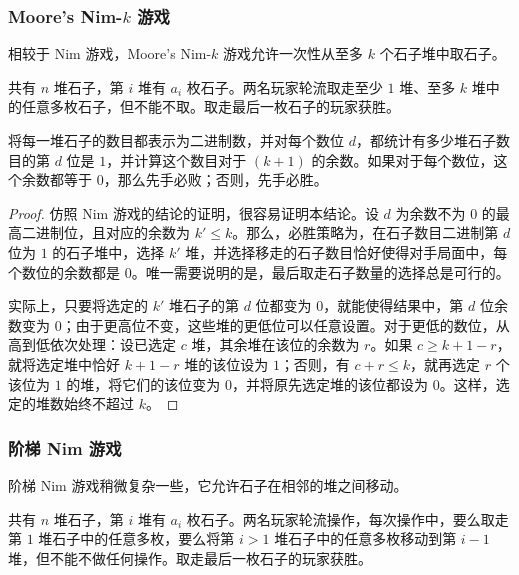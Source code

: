 \subsubsection{Moore's Nim-$k$ 游戏}

相较于 Nim 游戏，Moore's Nim-$k$ 游戏允许一次性从至多 $k$ 个石子堆中取石子。

\begin{game}
	共有 $n$ 堆石子，第 $i$ 堆有 $a_i$ 枚石子。两名玩家轮流取走至少 $1$ 堆、至多 $k$ 堆中的任意多枚石子，但不能不取。取走最后一枚石子的玩家获胜。
\end{game}

\begin{theorem}
	将每一堆石子的数目都表示为二进制数，并对每个数位 $d$，都统计有多少堆石子数目的第 $d$ 位是 $1$，并计算这个数目对于 $(k+1)$ 的余数。如果对于每个数位，这个余数都等于 $0$，那么先手必败；否则，先手必胜。
\end{theorem}

\begin{proof}
	仿照 Nim 游戏的结论的证明，很容易证明本结论。设 $d$ 为余数不为 $0$ 的最高二进制位，且对应的余数为 $k'\le k$。那么，必胜策略为，在石子数目二进制第 $d$ 位为 $1$ 的石子堆中，选择 $k'$ 堆，并选择移走的石子数目恰好使得对手局面中，每个数位的余数都是 $0$。唯一需要说明的是，最后取走石子数量的选择总是可行的。
	
	实际上，只要将选定的 $k'$ 堆石子的第 $d$ 位都变为 $0$，就能使得结果中，第 $d$ 位余数变为 $0$；由于更高位不变，这些堆的更低位可以任意设置。对于更低的数位，从高到低依次处理：设已选定 $c$ 堆，其余堆在该位的余数为 $r$。如果 $c\ge k+1-r$，就将选定堆中恰好 $k+1-r$ 堆的该位设为 $1$；否则，有 $c+r\le k$，就再选定 $r$ 个该位为 $1$ 的堆，将它们的该位变为 $0$，并将原先选定堆的该位都设为 $0$。这样，选定的堆数始终不超过 $k$。
\end{proof}

\newpage

\subsubsection{阶梯 Nim 游戏}

阶梯 Nim 游戏稍微复杂一些，它允许石子在相邻的堆之间移动。

\begin{game}[阶梯 Nim]
	共有 $n$ 堆石子，第 $i$ 堆有 $a_i$ 枚石子。两名玩家轮流操作，每次操作中，要么取走第 $1$ 堆石子中的任意多枚，要么将第 $i>1$ 堆石子中的任意多枚移动到第 $i-1$ 堆，但不能不做任何操作。取走最后一枚石子的玩家获胜。
\end{game}

